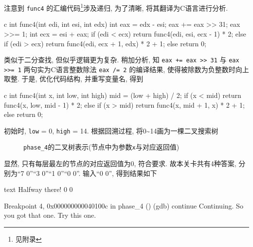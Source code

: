 注意到 \verb|func4| 的汇编代码\footnote{见附录 }涉及递归, 为了清晰, 将其翻译为C语言进行分析. 
\begin{code}{c}
int func4(int edi, int esi, int edx) {
    int eax = edx - esi;
    eax += eax >> 31;
    eax >>= 1;
    int ecx = esi + eax;
    if (edi < ecx)
        return func4(edi, esi, ecx - 1) * 2;
    else if (edi > ecx)
        return func4(edi, ecx + 1, edx) * 2 + 1;
    else
        return 0;
}
\end{code}
类似于二分查找, 但似乎逻辑更为复杂. 稍加分析, 知 \verb|eax += eax >> 31| 与 \verb|eax >>= 1| 两句实为C语言整数除法 \verb|eax /= 2| 的编译结果, 使得被除数为负整数时向上取整. 于是, 优化代码结构, 并重写变量名, 得到
\begin{code}{c}
int func4(int x, int low, int high) {
    mid = (low + high) / 2;
    if (x < mid)
        return func4(x, low, mid - 1) * 2;
    else if (x > mid)
        return func4(x, mid + 1, x) * 2 + 1;
    else
        return 0;
}
\end{code}
初始时, \verb|low| = 0, \verb|high| = 14. 根据回溯过程, 将0\textasciitilde14画为一棵二叉搜索树

\begin{figure}[H]
    \centering
    \small
    \caption{\texttt{phase_4}的二叉树表示(节点中为参数\texttt{x}与对应返回值)}
\end{figure}

显然, 只有每层最左的节点的对应返回值为0, 符合要求. 故本关卡共有4种答案, 分别为“7 0”“3 0”“1 0”“0 0”. 输入“0 0”, 得到结果如下
\begin{code}{text}
Halfway there!
0 0

Breakpoint 4, 0x000000000040100c in phase_4 ()
(gdb) continue
Continuing.
So you got that one.  Try this one.
\end{code}

